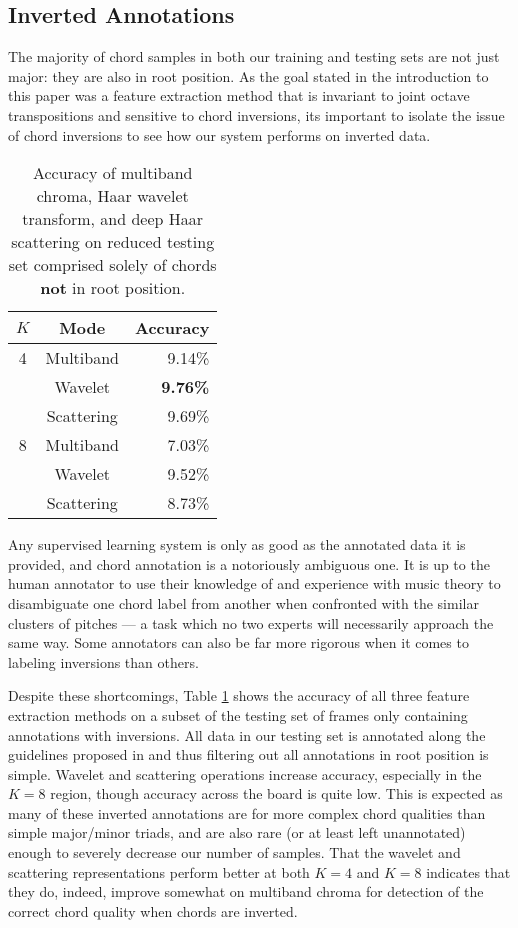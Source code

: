 \subsection{Inverted Annotations}

The majority of chord samples in both our training and testing sets are not just major: they are also in root position. As the goal stated in the introduction to this paper was a feature extraction method that is invariant to joint octave transpositions and sensitive to chord inversions, its important to isolate the issue of chord inversions to see how our system performs on inverted data.

\begin{table}
	\begin{center}
	\begin{tabular} {| c | c | r |}
	\hline
	$K$ & Mode & Accuracy \\
	\hline
	4 & Multiband & 9.14\% \\
	& Wavelet & \textbf{9.76\%} \\
	& Scattering & 9.69\% \\
	\hline
	8 & Multiband & 7.03\% \\
	& Wavelet & 9.52\% \\
	& Scattering & 8.73\% \\

	\hline
	\end{tabular}
	\end{center}
	\caption{Accuracy of multiband chroma, Haar wavelet transform, and deep Haar scattering on reduced testing set comprised solely of chords \textbf{not} in root position.}
	\label{table:inversions}
\end{table}

Any supervised learning system is only as good as the annotated data it is provided, and chord annotation is a notoriously ambiguous one. It is up to the human annotator to use their knowledge of and experience with music theory to disambiguate one chord label from another when confronted with the similar clusters of pitches --- a task which no two experts will necessarily approach the same way. Some annotators can also be far more rigorous when it comes to labeling inversions than others.

Despite these shortcomings, Table \ref{table:inversions} shows the accuracy of all three feature extraction methods on a subset of the testing set of frames only containing annotations with inversions. All data in our testing set is annotated along the guidelines proposed in \cite{harte2005symbolic} and thus filtering out all annotations in root position is simple. Wavelet and scattering operations increase accuracy, especially in the $K=8$ region, though accuracy across the board is quite low. This is expected as many of these inverted annotations are for more complex chord qualities than simple major/minor triads, and are also rare (or at least left unannotated) enough to severely decrease our number of samples. That the wavelet and scattering representations perform better at both $K=4$ and $K=8$ indicates that they do, indeed, improve somewhat on multiband chroma for detection of the correct chord quality when chords are inverted.

